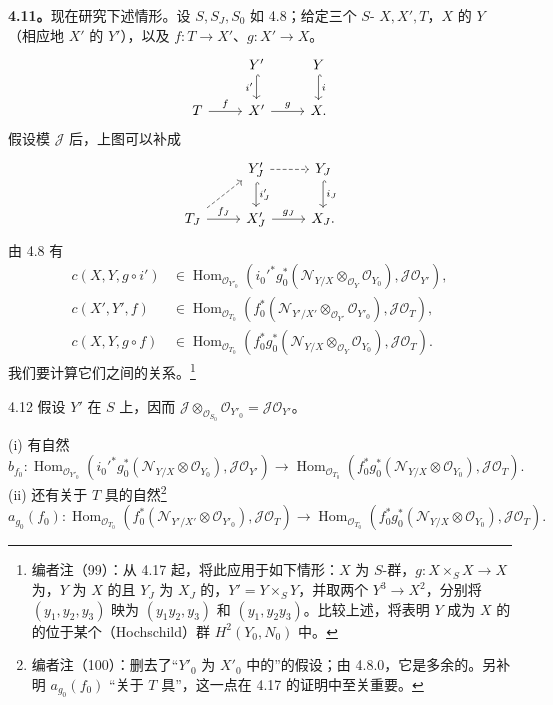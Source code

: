 \textbf{4.11。}现在研究下述情形。设 $S,S_J,S_0$ 如 4.8；给定三个 $S$- $X,X',T$，$X$ 的 $Y$（相应地 $X'$ 的 $Y'$），以及 $f:T\to X'$、$g:X'\to X$。
\[
\begin{tikzcd}
&Y'\arrow[d,hook,"i'"']&Y\arrow[d,hook,"i"]\\
T\arrow[r,"f"]&X'\arrow[r,"g"]&X.
\end{tikzcd}
\]
假设模 $\mathscr J$ 后，上图可以补成
\[
\begin{tikzcd}
&Y'_J\arrow[r,dashed]\arrow[d,hook,"i'_J"]&Y_J\arrow[d,hook,"i_J"]\\
T_J\arrow[r,"f_J"]\arrow[ur,dashed]&X'_J\arrow[r,"g_J"]&X_J.
\end{tikzcd}
\]
由 4.8 有
\[
\begin{aligned}
c(X,Y,g\circ i')&\in\operatorname{Hom}_{\mathscr O_{Y'_0}}(i_0'^*g_0^*(\mathscr N_{Y/X}\otimes_{\mathscr O_Y}\mathscr O_{Y_0}),\mathscr J\mathscr O_{Y'}),\\
c(X',Y',f)&\in\operatorname{Hom}_{\mathscr O_{T_0}}(f_0^*(\mathscr N_{Y'/X'}\otimes_{\mathscr O_{Y'}}\mathscr O_{Y'_0}),\mathscr J\mathscr O_T),\\
c(X,Y,g\circ f)&\in\operatorname{Hom}_{\mathscr O_{T_0}}(f_0^*g_0^*(\mathscr N_{Y/X}\otimes_{\mathscr O_Y}\mathscr O_{Y_0}),\mathscr J\mathscr O_T).
\end{aligned}
\]
我们要计算它们之间的关系。\footnote{编者注（99）：从 4.17 起，将此应用于如下情形：$X$ 为 $S$-群，$g:X\times_S X\to X$ 为，$Y$ 为 $X$ 的且 $Y_J$ 为 $X_J$ 的，$Y'=Y\times_S Y$，并取两个 $Y^3\to X^2$，分别将 $(y_1,y_2,y_3)$ 映为 $(y_1y_2,y_3)$ 和 $(y_1,y_2y_3)$。比较上述，将表明 $Y$ 成为 $X$ 的的位于某个（Hochschild）群 $H^2(Y_0,N_0)$ 中。}
\begin{SGAresult}{}{4.12}
假设 $Y'$ 在 $S$ 上，因而 $\mathscr J\otimes_{\mathscr O_{S_0}}\mathscr O_{Y'_0}=\mathscr J\mathscr O_{Y'}$。

(i) 有自然
\[b_{f_0}:\operatorname{Hom}_{\mathscr O_{Y'_0}}(i_0'^*g_0^*(\mathscr N_{Y/X}\otimes\mathscr O_{Y_0}),\mathscr J\mathscr O_{Y'})\longrightarrow\operatorname{Hom}_{\mathscr O_{T_0}}(f_0^*g_0^*(\mathscr N_{Y/X}\otimes\mathscr O_{Y_0}),\mathscr J\mathscr O_T).\]
(ii) 还有关于 $T$ 具的自然\footnote{编者注（100）：删去了“$Y'_0$ 为 $X'_0$ 中的”的假设；由 4.8.0，它是多余的。另补明 $a_{g_0}(f_0)$ “关于 $T$ 具”，这一点在 4.17 的证明中至关重要。}
\[a_{g_0}(f_0):\operatorname{Hom}_{\mathscr O_{T_0}}(f_0^*(\mathscr N_{Y'/X'}\otimes\mathscr O_{Y'_0}),\mathscr J\mathscr O_T)\longrightarrow\operatorname{Hom}_{\mathscr O_{T_0}}(f_0^*g_0^*(\mathscr N_{Y/X}\otimes\mathscr O_{Y_0}),\mathscr J\mathscr O_T).\]
\end{SGAresult}

